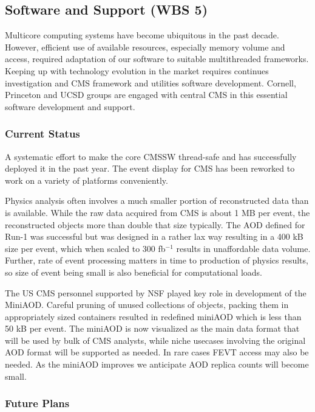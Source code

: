 \documentclass[11pt,a4paper]{article}
\begin{document}
\subsection{Software and Support (WBS 5)}

Multicore computing systems have become ubiquitous in the past
decade. However, efficient use of available resources, especially
memory volume and access, required adaptation of our software to
suitable multithreaded frameworks. Keeping up with technology
evolution in the market requires continues investigation and CMS
framework and utilities software development.  Cornell, Princeton and
UCSD groups are engaged with central CMS in this essential software
development and support.

\subsubsection{Current Status}

A systematic effort to make the core CMSSW thread-safe and has
successfully deployed it in the past year.  The event display
for CMS has been reworked to work on a variety of platforms
conveniently.


Physics analysis often involves a much smaller portion of
reconstructed data than is available. While the raw data acquired from
CMS is about 1 MB per event, the reconstructed objects more than
double that size typically. The AOD defined for Run-1 was successful
but was designed in a rather lax way resulting in a 400 kB size per
event, which when scaled to 300 fb$^{-1}$ results in unaffordable
data volume. Further, rate of event processing matters in time to
production of physics results, so size of event being small is also
beneficial for computational loads. 

The US CMS personnel supported by NSF played key role in development
of the MiniAOD.  Careful pruning of unused collections of objects, packing them
in appropriately sized containers resulted in redefined miniAOD which
is less than 50 kB per event. The miniAOD is now visualized as the main data format that will
be used by bulk of CMS analysts, while niche usecases involving the
original AOD format will be supported as needed. In rare cases FEVT
access may also be needed.  As the miniAOD improves we anticipate AOD
replica counts will become small. 

\subsubsection{Future Plans}
\end{document}
